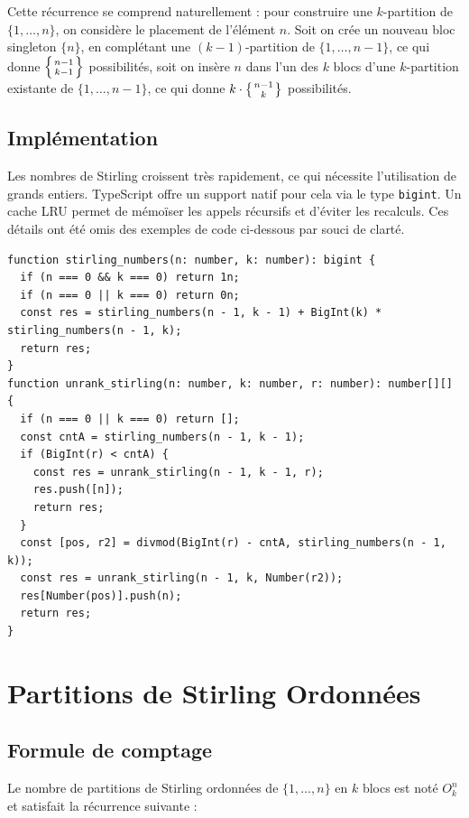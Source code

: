 \documentclass[12pt, a4paper]{report}
\begin{document}
Cette r\'ecurrence se comprend naturellement : pour construire une $k$-partition
de $\{1, \ldots, n\}$, on consid\`ere le placement de l'\'el\'ement $n$. Soit on
cr\'ee un nouveau bloc singleton $\{n\}$, en compl\'etant une $(k-1)$-partition
de $\{1, \ldots, n-1\}$, ce qui donne $\left\{n-1 \atop k-1\right\}$
possibilit\'es, soit on ins\`ere $n$ dans l'un des $k$ blocs d'une $k$-partition
existante de $\{1, \ldots, n-1\}$, ce qui donne
$k \cdot \left\{n-1 \atop k\right\}$ possibilit\'es.

\subsection{Impl\'ementation}

Les nombres de Stirling croissent tr\`es rapidement, ce qui n\'ecessite
l'utilisation de grands entiers. TypeScript offre un support natif pour cela
via le type \texttt{bigint}. Un cache LRU permet de m\'emoïser les appels
r\'ecursifs et d'\'eviter les recalculs. Ces d\'etails ont \'et\'e omis des
exemples de code ci-dessous par souci de clart\'e.

\begin{verbatim}
function stirling_numbers(n: number, k: number): bigint {
  if (n === 0 && k === 0) return 1n;
  if (n === 0 || k === 0) return 0n;
  const res = stirling_numbers(n - 1, k - 1) + BigInt(k) * stirling_numbers(n - 1, k);
  return res;
}
function unrank_stirling(n: number, k: number, r: number): number[][] {
  if (n === 0 || k === 0) return [];
  const cntA = stirling_numbers(n - 1, k - 1);
  if (BigInt(r) < cntA) {
    const res = unrank_stirling(n - 1, k - 1, r);
    res.push([n]);
    return res;
  }
  const [pos, r2] = divmod(BigInt(r) - cntA, stirling_numbers(n - 1, k));
  const res = unrank_stirling(n - 1, k, Number(r2));
  res[Number(pos)].push(n);
  return res;
}
\end{verbatim}

\section{Partitions de Stirling Ordonn\'ees}

\subsection{Formule de comptage}

Le nombre de partitions de Stirling ordonn\'ees de $\{1, \ldots, n\}$ en $k$ blocs
est not\'e $O^n_k$ et satisfait la r\'ecurrence suivante :
\end{document}
